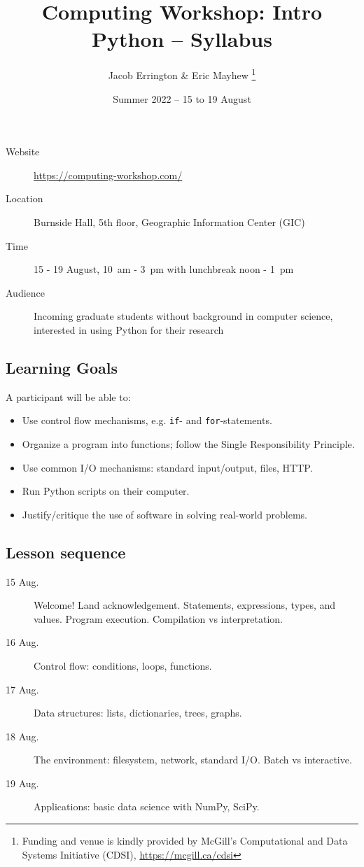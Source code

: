 \documentclass[11pt]{article}
\author{%
  Jacob Errington \& Eric Mayhew%
  \footnote{%
  Funding and venue is kindly provided by McGill's Computational and Data Systems Initiative (CDSI), \url{https://mcgill.ca/cdsi}
  }
}
\title{\vspace{-3em}Computing Workshop: Intro Python -- Syllabus}
\date{Summer 2022 -- 15 to 19 August}
\begin{document}
\maketitle

\begin{multicols}{2}
  \begin{description}
    \item[Website]
      \url{https://computing-workshop.com/}
    \item[Location]
      Burnside Hall, 5th floor, Geographic Information Center (GIC)
    \item[Time]
      15 - 19 August, 10~am - 3~pm with lunchbreak noon - 1~pm
    \item[Audience]
      Incoming graduate students without background in computer science,
      interested in using Python for their research
  \end{description}

  \subsection*{Learning Goals}

  A participant will be able to:

  \begin{itemize}
  \item Use control flow mechanisms, e.g. \lstinline!if!- and \lstinline!for!-statements.
  \item Organize a program into functions; follow the Single Responsibility Principle.
  \item Use common I/O mechanisms: standard input/output, files, HTTP.
  \item Run Python scripts on their computer.
  \item Justify/critique the use of software in solving real-world problems.
  \end{itemize}

  \subsection*{Lesson sequence}

  \begin{description}
  \item[15 Aug.] Welcome! Land acknowledgement. Statements, expressions, types,
    and values. Program execution. Compilation vs interpretation.
  \item[16 Aug.] Control flow: conditions, loops, functions.
  \item[17 Aug.] Data structures: lists, dictionaries, trees, graphs.
  \item[18 Aug.] The environment: filesystem, network, standard I/O. Batch vs interactive.
  \item[19 Aug.] Applications: basic data science with NumPy, SciPy.
  \end{description}


\end{multicols}
\end{document}
